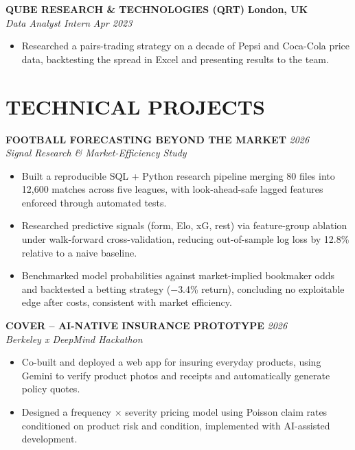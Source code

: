 \documentclass[10pt,a4paper]{article}
\begin{document}
\textbf{QUBE RESEARCH \& TECHNOLOGIES (QRT)} \hfill \textbf{London, UK}\\
\textit{Data Analyst Intern} \hfill \textit{Apr 2023}

\begin{itemize}
    \item Researched a pairs-trading strategy on a decade of Pepsi and Coca-Cola price data, backtesting the spread in Excel and presenting results to the team.
\end{itemize}


\section*{TECHNICAL PROJECTS}

\textbf{FOOTBALL FORECASTING BEYOND THE MARKET} \hfill \textit{2026}\\
\textit{Signal Research \& Market-Efficiency Study}

\begin{itemize}
    \item Built a reproducible SQL + Python research pipeline merging 80 files into 12,600 matches across five leagues, with look-ahead-safe lagged features enforced through automated tests.

    \item Researched predictive signals (form, Elo, xG, rest) via feature-group ablation under walk-forward cross-validation, reducing out-of-sample log loss by 12.8\% relative to a naive baseline.

    \item Benchmarked model probabilities against market-implied bookmaker odds and backtested a betting strategy ($-$3.4\% return), concluding no exploitable edge after costs, consistent with market efficiency.
\end{itemize}

\textbf{COVER -- AI-NATIVE INSURANCE PROTOTYPE} \hfill \textit{2026}\\
\textit{Berkeley x DeepMind Hackathon}

\begin{itemize}
    \item Co-built and deployed a web app for insuring everyday products, using Gemini to verify product photos and receipts and automatically generate policy quotes.

    \item Designed a frequency $\times$ severity pricing model using Poisson claim rates conditioned on product risk and condition, implemented with AI-assisted development.
\end{itemize}
\end{document}
